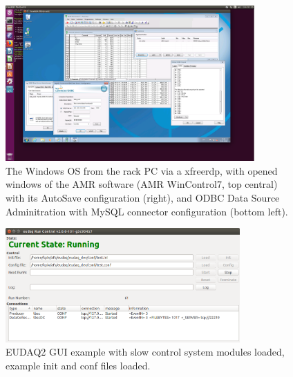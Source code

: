\documentclass[a4paper,12pt]{scrartcl}
\begin{document}
\begin{figure}[!ht]
\centering
\includegraphics[trim={5cm 5cm 7cm 2cm},clip,width=0.85\textwidth]{figs/AMRSoftware.png}
\caption{The Windows OS from the rack PC via a xfreerdp, with opened windows of the AMR software (AMR WinControl7, top central) with its AutoSave configuration (right), and ODBC Data Source Adminitration with MySQL connector configuration (bottom left).}
\label{fig:amr}
\end{figure}

\begin{figure}[!ht]
\centering
\includegraphics[width=0.8\textwidth]{figs/EUDAQ2_GUI_TBSC.png}
\caption{EUDAQ2 GUI example with slow control system modules loaded, example init and conf files loaded.}
\label{fig:eudaq2_GUI}
\end{figure}
\end{document}
